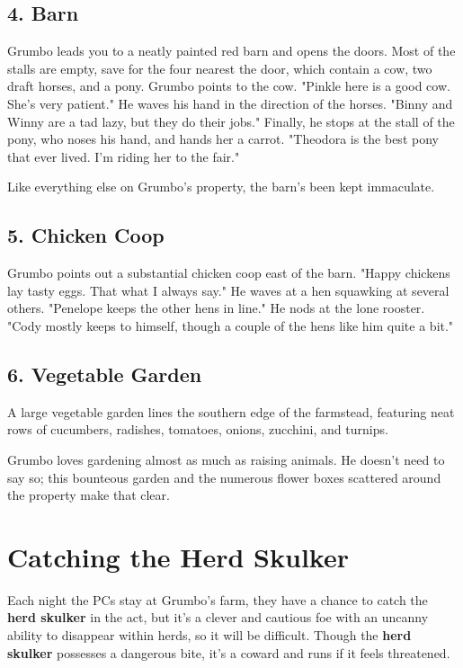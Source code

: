 \documentclass[10pt,a4paper,twoside,bg=print,twocolumn,openany,nodeprecatedcode]{dndbook}
\begin{document}
\subsection{4. Barn}
\begin{DndReadAloud}{}
Grumbo leads you to a neatly painted red barn and opens the doors. Most of the stalls are empty, save for the four nearest the door, which contain a cow, two draft horses, and a pony. Grumbo points to the cow. "Pinkle here is a good cow. She's very patient." He waves his hand in the direction of the horses. "Binny and Winny are a tad lazy, but they do their jobs." Finally, he stops at the stall of the pony, who noses his hand, and hands her a carrot. "Theodora is the best pony that ever lived. I'm riding her to the fair."

\end{DndReadAloud}

Like everything else on Grumbo's property, the barn's been kept immaculate.

\subsection{5. Chicken Coop}
\begin{DndReadAloud}{}
Grumbo points out a substantial chicken coop east of the barn. "Happy chickens lay tasty eggs. That what I always say." He waves at a hen squawking at several others. "Penelope keeps the other hens in line." He nods at the lone rooster. "Cody mostly keeps to himself, though a couple of the hens like him quite a bit."

\end{DndReadAloud}

\subsection{6. Vegetable Garden}
\begin{DndReadAloud}{}
A large vegetable garden lines the southern edge of the farmstead, featuring neat rows of cucumbers, radishes, tomatoes, onions, zucchini, and turnips.

\end{DndReadAloud}

Grumbo loves gardening almost as much as raising animals. He doesn't need to say so; this bounteous garden and the numerous flower boxes scattered around the property make that clear.

\section{Catching the Herd Skulker}
Each night the PCs stay at Grumbo's farm, they have a chance to catch the \textbf{herd skulker} in the act, but it's a clever and cautious foe with an uncanny ability to disappear within herds, so it will be difficult. Though the \textbf{herd skulker} possesses a dangerous bite, it's a coward and runs if it feels threatened.
\end{document}
